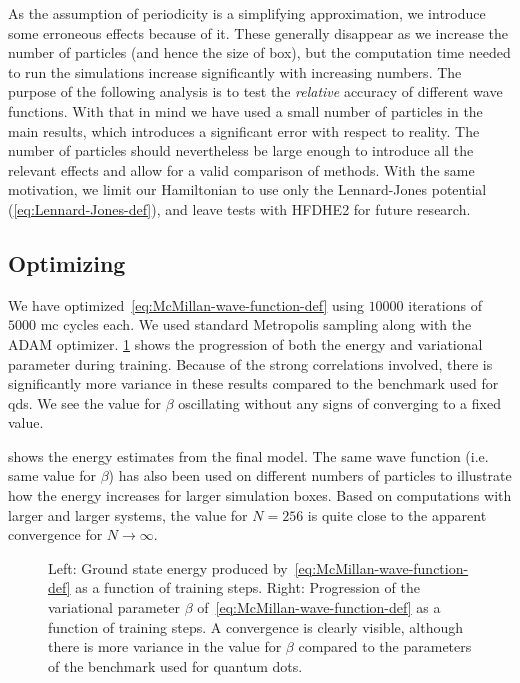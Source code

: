 \documentclass[Thesis.tex]{subfiles}
\begin{document}
\noindent As the assumption of periodicity is a simplifying approximation, we
introduce some erroneous effects because of it. These generally disappear as we
increase the number of particles (and hence the size of box), but the
computation time needed to run the simulations increase significantly with
increasing numbers. The purpose of the following analysis is to test the
\emph{relative} accuracy of different wave functions. With that in mind we have
used a small number of particles in the main results, which introduces a
significant error with respect to reality. The number of particles should nevertheless
be large enough to introduce all the relevant effects and allow for a valid
comparison of methods. With the same motivation, we limit our Hamiltonian to use
only the Lennard-Jones potential (\cref{eq:Lennard-Jones-def}), and leave tests
with HFDHE2 for future research.


\subsection{Optimizing}

We have optimized~\cref{eq:McMillan-wave-function-def} using $\num{10000}$
iterations of $\num{5000}$ \gls{mc} cycles each. We used standard Metropolis sampling
along with the ADAM optimizer. \cref{fig:He-benchmark-training} shows the
progression of both the energy and variational parameter during training.
Because of the strong correlations involved, there is significantly more
variance in these results compared to the benchmark used for \glspl{qd}. We
see the value for $\beta$ oscillating without any signs of converging to a
fixed value.

 shows the energy estimates from the final model.
The same wave function (i.e. same value for $\beta$) has also been used on
different numbers of particles to illustrate how the energy increases for larger
simulation boxes. Based on computations with larger and larger systems, the
value for $N = 256$ is quite close to the apparent convergence for $N\to\infty$.

\begin{figure}[h]
  \centering
  \resizebox{\linewidth}{!}{%
    
  }
  \caption[Learning progression of McMillan wave function on $^4$He]{\label{fig:He-benchmark-training}Left: Ground state energy produced by~\cref{eq:McMillan-wave-function-def}
    as a function of training steps. Right: Progression of the variational
    parameter $\beta$ of~\cref{eq:McMillan-wave-function-def} as a function of
    training steps. A convergence is clearly visible, although there is more
    variance in the value for $\beta$ compared to the parameters of the
    benchmark used for quantum dots.}
\end{figure}
\end{document}
